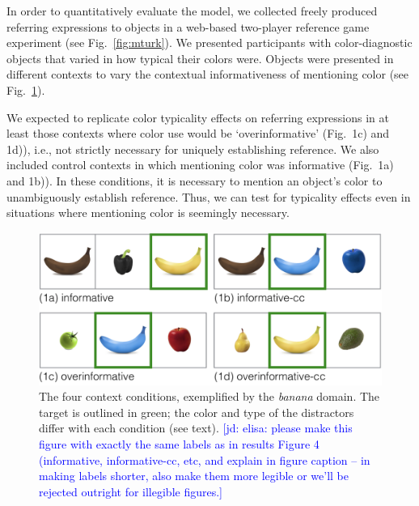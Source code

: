 \documentclass[10pt,letterpaper]{article}
\newcommand{\jd}[1]{\textcolor{Blue}{[jd: #1]}}
\newcommand{\figref}[1]{Fig.~\ref{#1}}
\begin{document}
In order to quantitatively evaluate the model, we collected freely produced referring expressions to objects in a web-based two-player reference game experiment (see \figref{fig:mturk}). We presented participants with color-diagnostic objects that varied in how typical their colors were. Objects were presented in different contexts to vary the contextual informativeness of mentioning color (see \figref{fig:contexts}). 


We expected to replicate color typicality effects on referring expressions in at least those contexts where color use would be `overinformative' (Fig.~1c) and 1d)), i.e., not strictly necessary for uniquely establishing reference. We also included control contexts in which mentioning color was informative (Fig.~1a) and 1b)). In these conditions, it is necessary to mention an object's color to unambiguously establish reference. Thus, we can test for typicality effects even in situations where mentioning color is seemingly necessary.

\begin{figure}
	\centering
	\includegraphics[width=.5\textwidth]{graphs/context_overview}
	\caption{The four context conditions, exemplified by the \textit{banana} domain. The target is outlined in green; the color and type of the distractors differ with each condition (see text). \jd{elisa: please make this figure with exactly the same labels as in  results Figure 4 (informative, informative-cc, etc, and explain in figure caption -- in making labels shorter, also make them more legible or we'll be rejected outright for illegible figures.}
	}
	\label{fig:contexts}
\end{figure}
\end{document}
